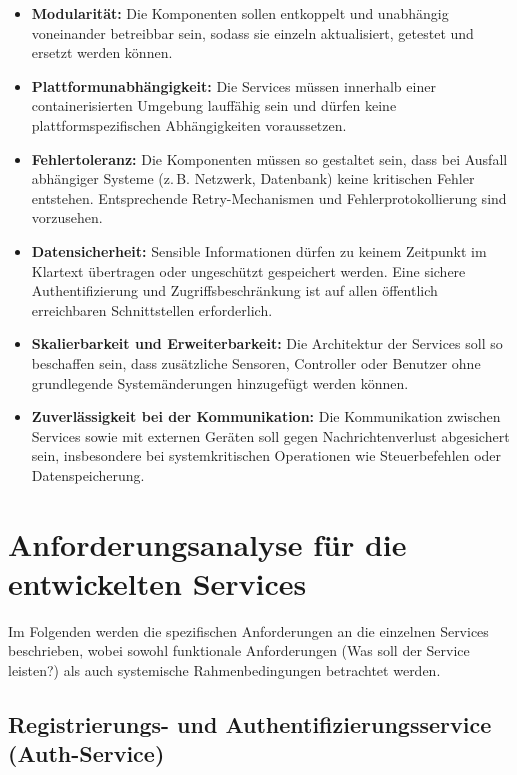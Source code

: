 \begin{itemize}
  \item \textbf{Modularität:} Die Komponenten sollen entkoppelt und unabhängig voneinander betreibbar sein, sodass sie einzeln aktualisiert, getestet und ersetzt werden können.

  \item \textbf{Plattformunabhängigkeit:} Die Services müssen innerhalb einer containerisierten Umgebung lauffähig sein und dürfen keine plattformspezifischen Abhängigkeiten voraussetzen.

  \item \textbf{Fehlertoleranz:} Die Komponenten müssen so gestaltet sein, dass bei Ausfall abhängiger Systeme (z.\,B. Netzwerk, Datenbank) keine kritischen Fehler entstehen. Entsprechende Retry-Mechanismen und Fehlerprotokollierung sind vorzusehen.

  \item \textbf{Datensicherheit:} Sensible Informationen dürfen zu keinem Zeitpunkt im Klartext übertragen oder ungeschützt gespeichert werden. Eine sichere Authentifizierung und Zugriffsbeschränkung ist auf allen öffentlich erreichbaren Schnittstellen erforderlich.

  \item \textbf{Skalierbarkeit und Erweiterbarkeit:} Die Architektur der Services soll so beschaffen sein, dass zusätzliche Sensoren, Controller oder Benutzer ohne grundlegende Systemänderungen hinzugefügt werden können.

  \item \textbf{Zuverlässigkeit bei der Kommunikation:} Die Kommunikation zwischen Services sowie mit externen Geräten soll gegen Nachrichtenverlust abgesichert sein, insbesondere bei systemkritischen Operationen wie Steuerbefehlen oder Datenspeicherung.
\end{itemize}

\section{Anforderungsanalyse für die entwickelten Services}

Im Folgenden werden die spezifischen Anforderungen an die einzelnen Services beschrieben, wobei sowohl funktionale Anforderungen (Was soll der Service leisten?) als auch systemische Rahmenbedingungen betrachtet werden.

\subsection{Registrierungs- und Authentifizierungsservice (Auth-Service)}

